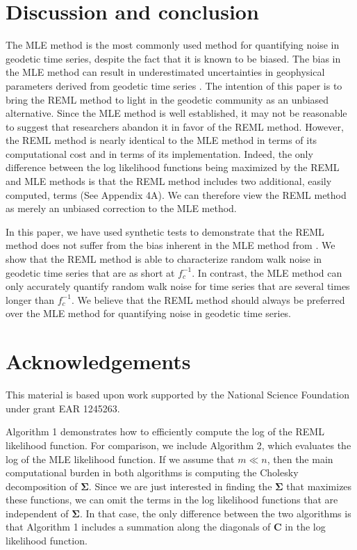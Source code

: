 \section{Discussion and conclusion}\label{ch4:sec:conclusion}
The MLE method is the most commonly used method for quantifying noise
in geodetic time series, despite the fact that it is known to be
biased. The bias in the MLE method can result in underestimated
uncertainties in geophysical parameters derived from geodetic time
series \citep{Langbein2012}. The intention of this paper is to bring
the REML method to light in the geodetic community as an unbiased
alternative. Since the MLE method is well established, it may not be
reasonable to suggest that researchers abandon it in favor of the REML
method.  However, the REML method is nearly identical to the MLE
method in terms of its computational cost and in terms of its
implementation. Indeed, the only difference between the log likelihood
functions being maximized by the REML and MLE methods is that the REML
method includes two additional, easily computed, terms (See Appendix
4A). We can therefore view the REML method as merely an unbiased
correction to the MLE method.

In this paper, we have used synthetic tests to demonstrate that the
REML method does not suffer from the bias inherent in the MLE method
from \citet{Langbein1997}. We show that the REML method is able to
characterize random walk noise in geodetic time series that are as
short at $f_c^{-1}$. In contrast, the MLE method can only accurately
quantify random walk noise for time series that are several times
longer than $f_c^{-1}$. We believe that the REML method should always
be preferred over the MLE method for quantifying noise in geodetic
time series.

\section{Acknowledgements}
This material is based upon work supported by the National Science
Foundation under grant EAR 1245263.

%  

Algorithm 1 demonstrates how to efficiently compute the log of the
REML likelihood function. For comparison, we include Algorithm 2,
which evaluates the log of the MLE likelihood function. If we assume
that $m \ll n$, then the main computational burden in both algorithms
is computing the Cholesky decomposition of $\mathbf{\Sigma}$. Since we
are just interested in finding the $\mathbf{\Sigma}$ that maximizes
these functions, we can omit the terms in the log likelihood functions
that are independent of $\mathbf{\Sigma}$. In that case, the only
difference between the two algorithms is that Algorithm 1 includes a
summation along the diagonals of $\mathbf{C}$ in the log likelihood
function.

